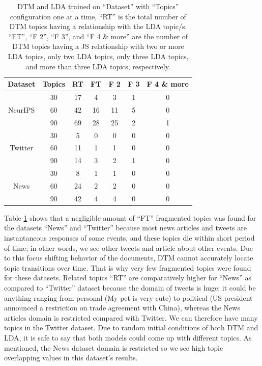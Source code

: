 \documentclass[a4paper]{report}
\begin{document}
\begin{table}[h!]
\begin{center}
\begin{tabular}{|c|c|c|c|c|c|c|}
\hline \textbf{Dataset} & \textbf{Topics} & \textbf{RT}& \textbf{FT} & \textbf{F 2} & \textbf{F 3} & \textbf{F 4 \& more} \\ \hline

\multirow{3}{*}{NeurIPS}  & 30 & 17 & 4 & 3 & 1 & 0 \\ & 60 & 42 & 16 & 11 & 5 & 0  \\ & 90 & 69 & 28 & 25 & 2 & 1 \\ \hline
\multirow{3}{*}{Twitter}  & 30 & 5 & 0 & 0 & 0 & 0 \\ & 60 & 11 & 1 & 1 & 0 & 0 \\ & 90 & 14 & 3 & 2 & 1 & 0 \\ \hline
\multirow{3}{*}{News}  & 30 & 8 & 1 & 1 & 0 & 0 \\ & 60 & 24 & 2 & 2 & 0 & 0 \\ & 90 & 42 & 4 & 4 & 0 & 0 \\ \hline

\end{tabular}
\caption{DTM and LDA trained on ``Dataset'' with ``Topics'' configuration one at a time, ``RT'' is the total number of DTM topics having a relationship with the LDA topic/s. ``FT'', ``F 2'', ``F 3'', and ``F 4 \& more'' are the number of DTM topics having a JS relationship with two or more LDA topics, only two LDA topics, only three LDA topics, and more than three LDA topics, respectively.}
\label{table:JStable}
\end{center}
\end{table}

Table \ref{table:JStable} shows that a negligible amount of ``FT'' fragmented topics was found for the datasets ``News'' and ``Twitter'' because most news articles and tweets are instantaneous responses of some events, and these topics die within short period of time; in other words, we see other tweets and article about other events. Due to this focus shifting behavior of the documents, DTM cannot accurately locate topic transitions over time. That is why very few fragmented topics were found for these datasets. Related topics ``RT'' are comparatively higher for ``News'' as compared to ``Twitter'' dataset because the domain of tweets is huge; it could be anything ranging from personal (My pet is very cute) to political (US president announced a restriction on trade agreement with China), whereas the News articles domain is restricted compared with Twitter. We can therefore have many topics in the Twitter dataset. Due to random initial conditions of both DTM and LDA, it is safe to say that both models could come up with different topics. As mentioned, the News dataset domain is restricted so we see high topic overlapping values in this dataset's results.
\end{document}

